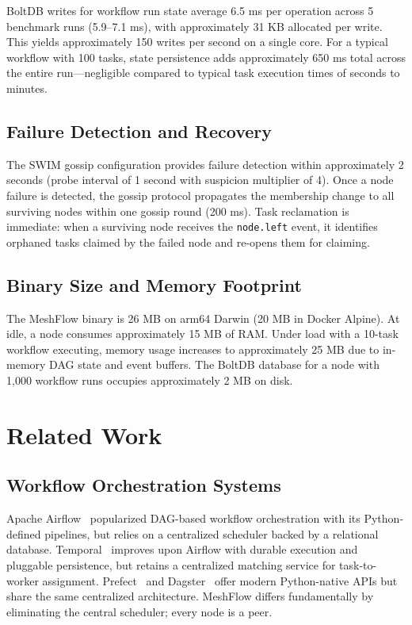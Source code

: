 \documentclass[sigconf]{acmart}
\begin{document}
BoltDB writes for workflow run state average 6.5 ms per operation across 5 benchmark runs (5.9--7.1 ms), with approximately 31 KB allocated per write. This yields approximately 150 writes per second on a single core. For a typical workflow with 100 tasks, state persistence adds approximately 650 ms total across the entire run---negligible compared to typical task execution times of seconds to minutes.

\subsection{Failure Detection and Recovery}

The SWIM gossip configuration provides failure detection within approximately 2 seconds (probe interval of 1 second with suspicion multiplier of 4). Once a node failure is detected, the gossip protocol propagates the membership change to all surviving nodes within one gossip round (200 ms). Task reclamation is immediate: when a surviving node receives the \texttt{node.left} event, it identifies orphaned tasks claimed by the failed node and re-opens them for claiming.

\subsection{Binary Size and Memory Footprint}

The MeshFlow binary is 26 MB on arm64 Darwin (20 MB in Docker Alpine). At idle, a node consumes approximately 15 MB of RAM. Under load with a 10-task workflow executing, memory usage increases to approximately 25 MB due to in-memory DAG state and event buffers. The BoltDB database for a node with 1,000 workflow runs occupies approximately 2 MB on disk.

\section{Related Work}

\subsection{Workflow Orchestration Systems}

Apache Airflow~\cite{airflow} popularized DAG-based workflow orchestration with its Python-defined pipelines, but relies on a centralized scheduler backed by a relational database. Temporal~\cite{temporal} improves upon Airflow with durable execution and pluggable persistence, but retains a centralized matching service for task-to-worker assignment. Prefect~\cite{prefect} and Dagster~\cite{dagster} offer modern Python-native APIs but share the same centralized architecture. MeshFlow differs fundamentally by eliminating the central scheduler; every node is a peer.
\end{document}
